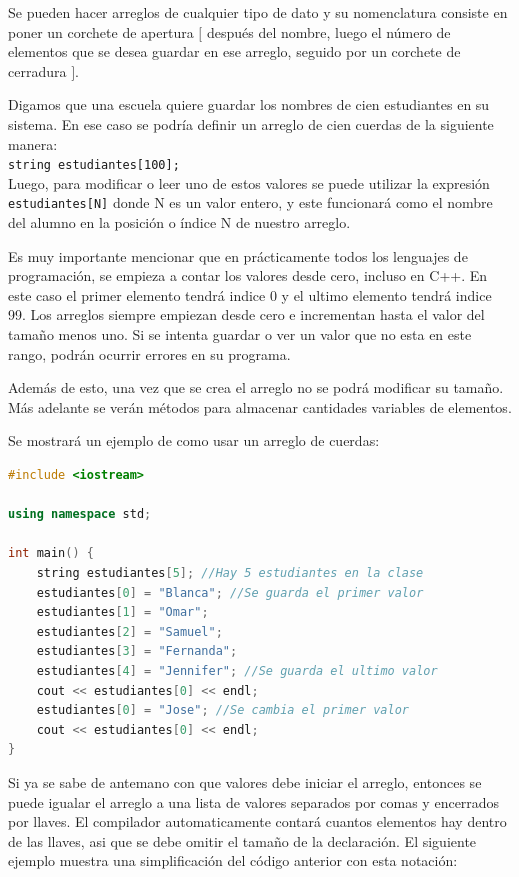 \documentclass{article}
\begin{document}
Se pueden hacer arreglos de cualquier tipo de dato y su nomenclatura consiste en poner un corchete de apertura $[$ después del nombre, luego el número de elementos que se desea guardar en ese arreglo, seguido por un corchete de cerradura $]$.

Digamos que una escuela quiere guardar los nombres de cien estudiantes en su sistema. En ese caso se podría definir un arreglo de cien cuerdas de la siguiente manera: \\

\lstinline{string estudiantes[100];} \\

Luego, para modificar o leer uno de estos valores se puede utilizar la expresión \lstinline{estudiantes[N]} donde N es un valor entero, y este funcionará como el nombre del alumno en la posición o índice N de nuestro arreglo.

Es muy importante mencionar que en prácticamente todos los lenguajes de programación, se empieza a contar los valores desde cero, incluso en C++. En este caso el primer elemento tendrá indice 0 y el ultimo elemento tendrá indice 99. Los arreglos siempre empiezan desde cero e incrementan hasta el valor del tamaño menos uno. Si se intenta guardar o ver un valor que no esta en este rango, podrán ocurrir errores en su programa.

Además de esto, una vez que se crea el arreglo no se podrá modificar su tamaño. Más adelante se verán métodos para almacenar cantidades variables de elementos.

Se mostrará un ejemplo de como usar un arreglo de cuerdas:

\begin{lstlisting}[language=C++, title=Arreglo de cuerdas]
#include <iostream>

using namespace std;

int main() {
	string estudiantes[5]; //Hay 5 estudiantes en la clase
	estudiantes[0] = "Blanca"; //Se guarda el primer valor
	estudiantes[1] = "Omar";
	estudiantes[2] = "Samuel";
	estudiantes[3] = "Fernanda";
	estudiantes[4] = "Jennifer"; //Se guarda el ultimo valor
	cout << estudiantes[0] << endl;
	estudiantes[0] = "Jose"; //Se cambia el primer valor
	cout << estudiantes[0] << endl;
}
\end{lstlisting}

Si ya se sabe de antemano con que valores debe iniciar el arreglo, entonces se puede igualar el arreglo a una lista de valores separados por comas y encerrados por llaves. El compilador automaticamente contará cuantos elementos hay dentro de las llaves, asi que se debe omitir el tamaño de la declaración. El siguiente ejemplo muestra una simplificación del código anterior con esta notación:
\end{document}
